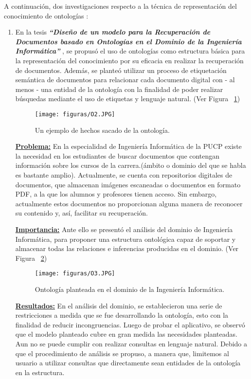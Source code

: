 \documentclass[10pt,conference]{IEEEtran}
\begin{document}
\par A continuación, dos investigaciones respecto a la técnica de representación del conocimiento de ontologías :
\begin{enumerate}
\item En la tesis \textbf{\textit{“Diseño de un modelo para la Recuperación de Documentos basado en Ontologías en el Dominio de la Ingeniería Informática”}} \citep{gomez2014}, se propusó el uso de ontologías como estructura básica para la representación del conocimiento por su eficacia en realizar la recuperación de documentos. Además, se planteó utilizar un proceso de etiquetación semántica de documentos para relacionar cada documento digital con - al menos - una entidad de la ontología con la finalidad de poder realizar búsquedas mediante el uso de etiquetas y lenguaje natural.  (Ver Figura ~\ref{fO2})

\begin{figure}[H]
 \begin{center}
       \texttt{[image: figuras/O2.JPG]}
      \caption{Un ejemplo de hechos sacado de la ontología.}
      \label{fO2} 
      \end{center}
\end{figure}
\textbf{\underline{Problema:}}
En la especialidad de Ingeniería Informática de la PUCP existe la necesidad en los estudiantes de buscar documentos que contengan información sobre los cursos de la carrera.(ámbito o dominio del que se habla es bastante amplio).
Actualmente, se cuenta con repositorios digitales de documentos, que almacenan imágenes escaneadas o documentos en formato PDF, a la que los alumnos y profesores tienen acceso. Sin embargo, actualmente estos documentos no proporcionan alguna manera de reconocer su contenido y, así, facilitar su recuperación. \par
\textbf{\underline{Importancia:}}
Ante ello se presentó el análisis del dominio de Ingeniería Informática, para proponer una estructura ontológica capaz de soportar y almacenar todas las relaciones e inferencias producidas en el dominio. (Ver Figura ~\ref{fO3}) \par

\begin{figure}[H]
 \begin{center}
       \texttt{[image: figuras/O3.JPG]}
      \caption{Ontología planteada en el dominio de la Ingeniería Informática.}
      \label{fO3} 
      \end{center}
\end{figure}
\textbf{\underline{Resultados:}}
En el análisis del dominio, se establecieron una serie de restricciones a medida que se fue desarrollando la ontología, esto con la finalidad de reducir incongruencias. Luego de probar el aplicativo, se observó que el modelo planteado cubre en gran medida las necesidades planteadas. Aun no se puede cumplir con realizar consultas en lenguaje natural. Debido a que el procedimiento de análisis se propuso, a manera que, limitemos al usuario a utilizar consultas que directamente sean entidades de la ontología en la estructura.


\end{enumerate}
\end{document}
